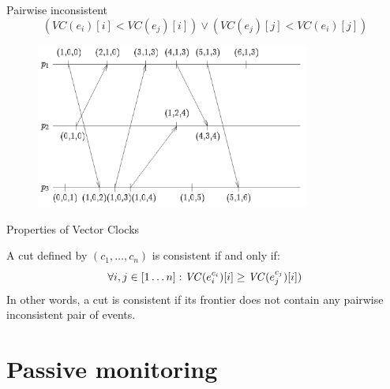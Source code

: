 \begin{frame}{Pairwise inconsistent}
\[
   (VC(e_i)[i] < VC(e_j)[i]) \vee (VC(e_j)[j] < VC(e_i)[j])
\]

\begin{figure} 
\includegraphics[width=9cm]{figs/02/figure-7}
\end{figure}


\end{frame}

\begin{frame}{Properties of Vector Clocks}
	
\begin{definition}
A cut defined by $(c_1, \ldots, c_n)$ is \alert{consistent} if and only if:
\[
  \forall i,j \in [1 \ldots n]: \mathit{VC}(e_i^{c_i})[i] \geq \mathit{VC}(e_j^{c_j})[i])
\]
In other words, a cut is consistent if its frontier does not contain any
pairwise inconsistent pair of events.
\end{definition}

\end{frame}






\section{Passive monitoring}



